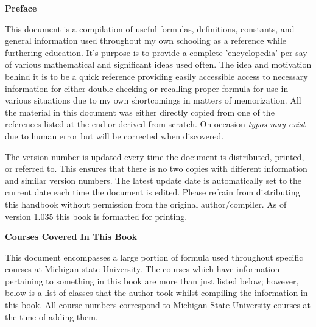\begin{center}
	\textbf{Preface}
\end{center}

This document is a compilation of useful formulas, definitions, constants, and general information used throughout my own schooling as a reference while furthering education. It's purpose is to provide a complete 'encyclopedia' per say of various mathematical and significant ideas used often. The idea and motivation behind it is to be a quick reference providing easily accessible access to necessary information for either double checking or recalling proper formula for use in various situations due to my own shortcomings in matters of memorization. All the material in this document was either directly copied from one of the references listed at the end or derived from scratch. On occasion \textit{typos may exist} due to human error but will be corrected when discovered.
	
The version number is updated every time the document is distributed, printed, or referred to. This ensures that there is no two copies with different information and similar version numbers. The latest update date is automatically set to the current date each time the document is edited. Please refrain from distributing this handbook without permission from the original author/compiler. As of version 1.035 this book is formatted for printing.

\begin{center}
	\textbf{Courses Covered In This Book}
\end{center}

This document encompasses a large portion of formula used throughout specific courses at Michigan state University. The courses which have information pertaining to something in this book are more than just listed below; however, below is a list of classes that the author took whilst compiling the information in this book. All course numbers correspond to Michigan State University courses at the time of adding them. 

